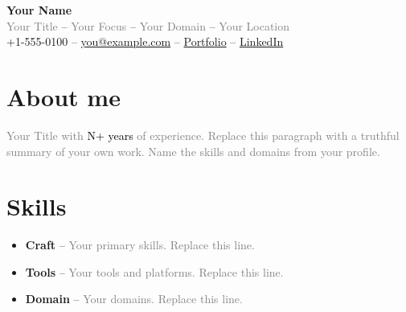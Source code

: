 \documentclass[12pt,letterpaper]{article}
\begin{document}
\begin{center}
{\Huge \textbf{Your Name}} \\ \vspace{4pt}
{\normalsize \textcolor{gray}{Your Title} -- \textcolor{gray}{Your Focus} -- \textcolor{gray}{Your Domain} -- \textcolor{gray}{Your Location}} \\ \vspace{4pt}
 +1-555-0100 --
\href{mailto:you@example.com}{you@example.com} --
\href{https://example.com}{Portfolio} --
\href{https://www.linkedin.com/in/your-handle/}{LinkedIn}
\end{center}

\vspace{-8pt}
\hrulefill
\vspace{4pt}

\section{About me}
\vspace{2pt}
\normalsize{\textcolor{gray}{Your Title with \textcolor{black}{N+ years} of experience. Replace this paragraph with a truthful summary of your own work. Name the skills and domains from your profile.}}

\section{Skills}
\vspace{2pt}
\begin{itemize}[label={}, labelwidth=0pt, labelsep=0pt, itemsep=2pt]
\normalsize
\item[] \textbf{Craft} -- \textcolor{gray}{Your primary skills. Replace this line.}
\item[] \textbf{Tools} -- \textcolor{gray}{Your tools and platforms. Replace this line.}
\item[] \textbf{Domain} -- \textcolor{gray}{Your domains. Replace this line.}
\end{itemize}

\end{document}
